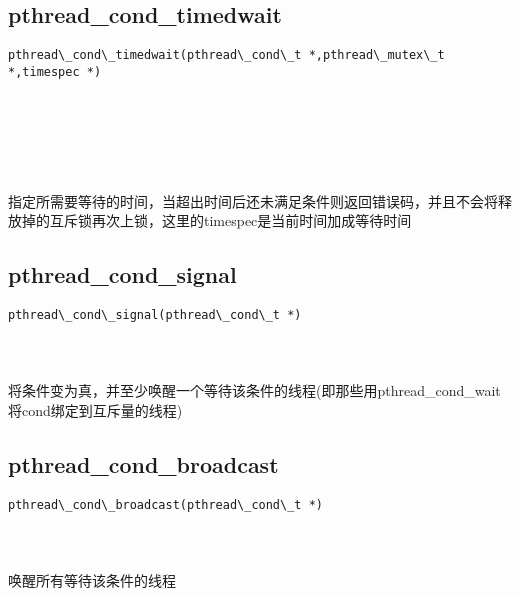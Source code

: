 \documentclass[10pt,a4paper]{article}
\begin{document}
\subsection{pthread\_cond\_timedwait}
\begin{spacing}{2.0}
\lstset{language=C,numbers=none}
\begin{lstlisting}
pthread\_cond\_timedwait(pthread\_cond\_t *,pthread\_mutex\_t *,timespec *)
\end{lstlisting}
{\large\color[rgb]{0.2,0.4,0.6}{*:}} \\
{\large\color[rgb]{0.2,0.4,0.6}{*:}} \\
{\large\color[rgb]{0.2,0.4,0.6}{*:}}
\paragraph{ \ \ }指定所需要等待的时间，当超出时间后还未满足条件则返回错误码，并且不会将释放掉的互斥锁再次上锁，这里的timespec是当前时间加成等待时间
\end{spacing}

\subsection{pthread\_cond\_signal}
\begin{spacing}{2.0}
\lstset{language=C,numbers=none}
\begin{lstlisting}
pthread\_cond\_signal(pthread\_cond\_t *)
\end{lstlisting}
{\large\color[rgb]{0.2,0.4,0.6}{*:}}
\paragraph{ \ \ }将条件变为真，并至少唤醒一个等待该条件的线程(即那些用pthread\_cond\_wait将cond绑定到互斥量的线程)
\end{spacing}

\subsection{pthread\_cond\_broadcast}
\begin{spacing}{2.0}
\lstset{language=C,numbers=none}
\begin{lstlisting}
pthread\_cond\_broadcast(pthread\_cond\_t *)
\end{lstlisting}
{\large\color[rgb]{0.2,0.4,0.6}{*:}}
\paragraph{ \ \ }唤醒所有等待该条件的线程
\end{spacing}
\end{document}
